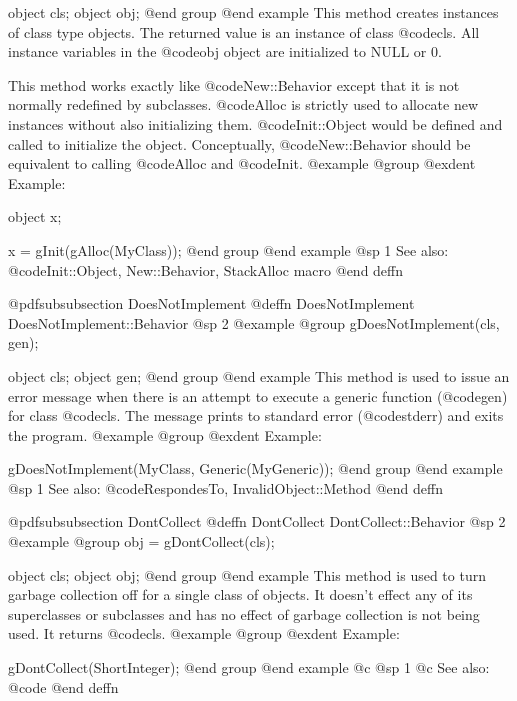 object  cls;
object  obj;
@end group
@end example
This method creates instances of class type objects.  The
returned value is an instance of class @code{cls}.  All instance
variables in the @code{obj} object are initialized to NULL or 0.

This method works exactly like @code{New::Behavior} except that it
is not normally redefined by subclasses.  @code{Alloc} is strictly
used to allocate new instances without also initializing them.
@code{Init::Object} would be defined and called to initialize the
object.  Conceptually, @code{New::Behavior} should be equivalent to
calling @code{Alloc} and @code{Init}.
@example
@group
@exdent Example:

object  x;

x = gInit(gAlloc(MyClass));
@end group
@end example
@sp 1
See also:  @code{Init::Object, New::Behavior, StackAlloc macro}
@end deffn






@pdfsubsubsection {DoesNotImplement}
@deffn {DoesNotImplement} DoesNotImplement::Behavior
@sp 2
@example
@group
gDoesNotImplement(cls, gen);

object  cls;
object  gen;
@end group
@end example
This method is used to issue an error message when there is an attempt 
to execute a generic function (@code{gen}) for class @code{cls}.
The message prints to standard error (@code{stderr}) and exits the program.
@example
@group
@exdent Example:

gDoesNotImplement(MyClass, Generic(MyGeneric));
@end group
@end example
@sp 1
See also:  @code{RespondesTo, InvalidObject::Method}
@end deffn











@pdfsubsubsection {DontCollect}
@deffn {DontCollect} DontCollect::Behavior
@sp 2
@example
@group
obj = gDontCollect(cls);

object  cls;
object  obj;
@end group
@end example
This method is used to turn garbage collection off for a single
class of objects.  It doesn't effect any of its superclasses or subclasses and
has no effect of garbage collection is not being used.  It returns
@code{cls}.
@example
@group
@exdent Example:

gDontCollect(ShortInteger);
@end group
@end example
@c @sp 1
@c See also:  @code{}
@end deffn












